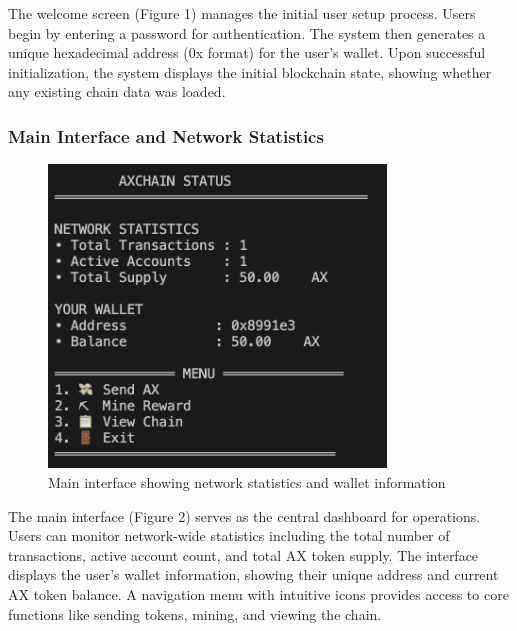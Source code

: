 \documentclass[12pt]{article}
\begin{document}
The welcome screen (Figure 1) manages the initial user setup process. Users begin by entering a password for authentication. The system then generates a unique hexadecimal address (0x format) for the user's wallet. Upon successful initialization, the system displays the initial blockchain state, showing whether any existing chain data was loaded.

\subsubsection{Main Interface and Network Statistics}
\begin{figure}[H]
\centering
\includegraphics[width=0.8\textwidth]{main_menu.png}
\caption{Main interface showing network statistics and wallet information}
\end{figure}

The main interface (Figure 2) serves as the central dashboard for operations. 
Users can monitor network-wide statistics including the total number of transactions, 
active account count, and total AX token supply. The interface displays the user's 
wallet information, showing their unique address and current AX token balance. 
A navigation menu with intuitive icons provides access to core functions like 
sending tokens, mining, and viewing the chain.
\end{document}
